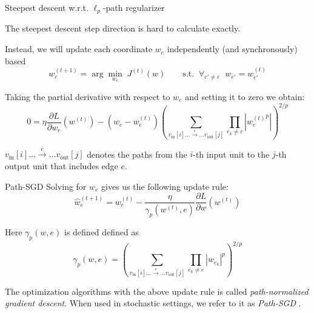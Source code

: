 \documentclass[presentation,xcolor={usenames,dvipsnames},10pt]{beamer}
\newcommand{\RSGD}{Path-SGD }
\begin{document}
\begin{frame}{Steepest descent w.r.t. $\ell_p$-path regularizer}
\bit 
\item The steepest descent step direction is hard to calculate exactly.  

\item Instead, we will update each coordinate $w_e$ independently (and synchronously) based 
\begin{equation}
w_e^{(t+1)} =\arg\min_{w_e} \;J^{(t)}(w) \qquad \text{s.t.}\;\;\forall_{e'\neq e} \;\; w_{e'}=w^{(t)}_{e'}
\end{equation}

\item Taking the partial derivative with respect to $w_e$ and setting it to zero we obtain:
\begin{equation*}
0 =\eta \frac{\partial L}{\partial w_e}(w^{(t)}) - \left(w_e-w^{(t)}_e\right) \left(\sum_{v_{\text{in}}[i] \dots \stackrel{e}{\rightarrow} \dots v_{\text{out}}[j]} \prod_{e_k\neq e} |{w^{(t)}_e}^p|\right)^{2/p}
\end{equation*}
\item $v_{\text{in}}[i] \dots \stackrel{e}{\rightarrow} \dots v_{\text{out}}[j]$ denotes the paths from the  $i$-th input unit to the $j$-th output unit that includes edge $e$. 
\eit 
\end{frame}

\begin{frame}{Path-SGD}
Solving for $w_e$  gives us the following update rule:
\begin{equation*}
\hat{w}^{(t+1)}_e = w^{(t)}_e- \frac{\eta}{\gamma_p(w^{(t)},e)}\frac{\partial L}{\partial w}(w^{(t)})
\end{equation*}

Here $\gamma_p(w,e)$ is defined defined as 
\begin{equation*}
\gamma_p(w,e) =\left(\sum_{v_{\text{in}}[i] \dots \stackrel{e}{\rightarrow} \dots v_{\text{out}}[j]} \prod_{e_k\neq e} |{w_{e_k}}|^p\right)^{2/p}
\end{equation*}

The optimization algorithms with the above update rule is called \emph{path-normalized gradient descent}. When used in stochastic settings, we refer to it as \emph{\RSGD}.
\end{frame}
\end{document}
